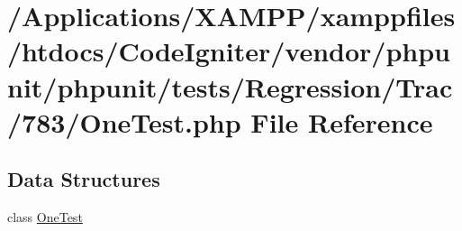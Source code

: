 \hypertarget{_regression_2_trac_2783_2_one_test_8php}{}\section{/\+Applications/\+X\+A\+M\+P\+P/xamppfiles/htdocs/\+Code\+Igniter/vendor/phpunit/phpunit/tests/\+Regression/\+Trac/783/\+One\+Test.php File Reference}
\label{_regression_2_trac_2783_2_one_test_8php}
\subsection*{Data Structures}
\begin{DoxyCompactItemize}
\item 
class \mbox{\hyperlink{class_one_test}{One\+Test}}
\end{DoxyCompactItemize}
